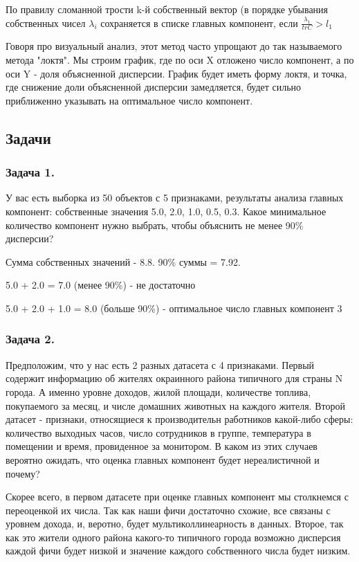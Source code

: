 По правилу сломанной трости k-й собственный вектор (в порядке убывания собственных чисел $\lambda _{i}$ сохраняется в списке главных компонент, если $\frac {\lambda _{1}}{tr C} >l_{1}$

Говоря про визуальный анализ, этот метод часто упрощают до так называемого метода "локтя". Мы строим график, где по оси X отложено число компонент, а по оси Y - доля объясненной дисперсии. График будет иметь форму локтя, и точка, где снижение доли объясненной дисперсии замедляется, будет сильно приближенно указывать на оптимальное число компонент.

\subsection{Задачи}
\subsubsection*{Задача 1.}

У вас есть выборка из 50 объектов с 5 признаками, результаты анализа главных компонент: собственные значения 5.0, 2.0, 1.0, 0.5, 0.3. Какое минимальное количество компонент нужно выбрать, чтобы объяснить не менее 90\% дисперсии?

\begin{solution}
    Сумма собственных значений - 8.8. 90\% суммы = 7.92.
    
    5.0 + 2.0 = 7.0 (менее 90\%) - не достаточно

    5.0 + 2.0 + 1.0 = 8.0 (больше 90\%) - оптимальное число главных компонент 3 
\end{solution}
\subsubsection*{Задача 2.}

Предположим, что у нас есть 2 разных датасета с 4 признаками. Первый содержит информацию об жителях окраинного района типичного для страны N города. А именно уровне доходов, жилой площади, количестве топлива, покупаемого за месяц, и числе домашних животных на каждого жителя. Второй датасет - признаки, относящиеся к производительн работников какой-либо сферы: количество выходных часов, число сотрудников в группе, температура в помещении и время, провиденное за монитором. В каком из этих случаев вероятно ожидать, что оценка главных компонент будет нереалистичной и почему?  

\begin{solution}
    Скорее всего, в первом датасете при оценке главных компонент мы столкнемся с переоценкой их числа. Так как наши фичи достаточно схожие, все связаны с уровнем дохода, и, веротно, будет мультиколлинеарность в данных. Второе, так как это жители одного района какого-то типичного города возможно дисперсия каждой фичи будет низкой и значение каждого собственного числа будет низким.
\end{solution}


